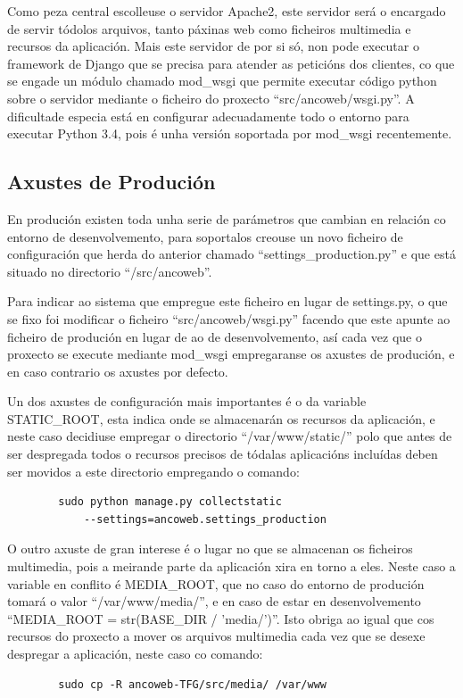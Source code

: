         Como peza central escolleuse o servidor Apache2, este servidor será o encargado de servir 
        tódolos arquivos, tanto páxinas web como ficheiros multimedia e recursos da aplicación. Mais
        este servidor de por si só, non pode executar o framework de Django que se precisa para 
        atender as peticións dos clientes, co que se engade un módulo chamado mod\_wsgi
        que permite executar código python sobre o servidor mediante o ficheiro do proxecto
        ``src/ancoweb/wsgi.py''. A dificultade especia está en configurar adecuadamente todo o entorno
        para executar Python 3.4, pois é unha versión soportada por mod\_wsgi recentemente.
        
    \subsection{Axustes de Produción}
        En produción existen toda unha serie de parámetros que cambian en relación co entorno de 
        desenvolvemento, para soportalos creouse un novo ficheiro de configuración que herda do 
        anterior chamado ``settings\_production.py'' e que está situado no directorio 
        ``/src/ancoweb''.
        
        Para indicar ao sistema que empregue este ficheiro en lugar de settings.py, o que se fixo 
        foi modificar o ficheiro ``src/ancoweb/wsgi.py'' facendo que este apunte ao ficheiro de 
        produción en lugar de ao de desenvolvemento, así cada vez que o proxecto se execute mediante
        mod\_wsgi empregaranse os axustes de produción, e en caso contrario os axustes por defecto.
        
        Un dos axustes de configuración mais importantes é o da variable STATIC\_ROOT, esta indica
        onde se almacenarán os recursos da aplicación, e neste caso decidiuse empregar o directorio
        ``/var/www/static/'' polo que antes de ser despregada todos o recursos precisos de tódalas 
        aplicacións incluídas deben ser movidos a este directorio empregando o comando:
        
        \begin{verbatim}
        sudo python manage.py collectstatic 
            --settings=ancoweb.settings_production
        \end{verbatim}

        O outro axuste de gran interese é o lugar no que se almacenan os ficheiros multimedia, pois
        a meirande parte da aplicación xira en torno a eles. Neste caso a variable en conflito é 
        MEDIA\_ROOT, que no caso do entorno de produción tomará o valor ``/var/www/media/'', e en 
        caso de estar en desenvolvemento ``MEDIA\_ROOT = str(BASE\_DIR / 'media/')''. Isto obriga ao 
        igual que cos recursos do proxecto a mover os arquivos multimedia cada vez que se desexe 
        despregar a aplicación, neste caso co comando:
        
        \begin{verbatim}
        sudo cp -R ancoweb-TFG/src/media/ /var/www
        \end{verbatim}
